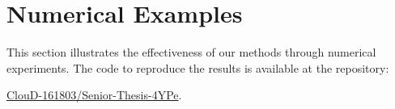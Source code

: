 \section{Numerical Examples}
This section illustrates the effectiveness of our methods
through numerical experiments. The code to reproduce the results is available at the repository:
\begin{center}
    \href{https://github.com/ClouD-161803/Senior-Thesis-4YPe.git}{ClouD-161803/Senior-Thesis-4YPe}.
\end{center}

